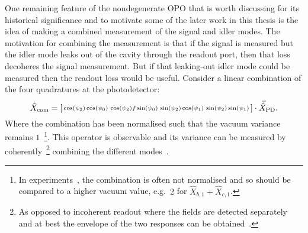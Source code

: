 

One remaining feature of the nondegenerate OPO that is worth discussing for its historical significance and to motivate some of the later  work in this thesis is the idea of making a combined measurement of the signal and idler modes. The motivation for combining the measurement is that if the signal is measured but the idler mode leaks out of the cavity through the readout port, then that loss decoheres the signal measurement. But if that leaking-out idler mode could be measured then the readout loss would be useful. Consider a linear combination of the four quadratures at the photodetector:
\begin{equation}\label{eq:Xcom_three_angles}
\hat X_\text{com}=\begin{bsmallmatrix}\cos(\psi_2)\cos(\psi_0) & \cos(\psi_2)f\sin(\psi_0) & \sin(\psi_2)\cos(\psi_1) & \sin(\psi_2)\sin(\psi_1)\end{bsmallmatrix}\cdot\vec{\hat X}_\text{PD}.
\end{equation} 
Where the combination has been normalised such that the vacuum variance remains $1$~\footnote{In experiments~\cite{schoriNarrowbandFrequencyTunable2002}, the combination is often not normalised and so should be compared to a higher vacuum value, e.g.\ $2$ for $\hat X_{b,1} + \hat X_{c,1}$.}. This operator is observable and its variance can be measured by coherently~\footnote{As opposed to incoherent readout where the fields are detected separately and at best the envelope of the two responses can be obtained~\cite{}.} combining the different modes~\cite{schoriNarrowbandFrequencyTunable2002}.  
